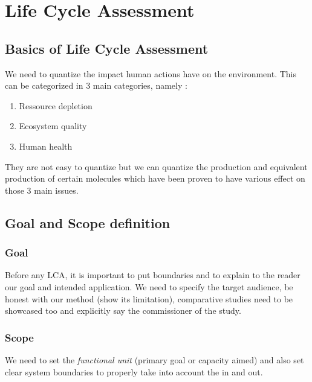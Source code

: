 \hypertarget{life-cycle-assessment}{%
\section{Life Cycle Assessment}\label{life-cycle-assessment}}

\hypertarget{basics-of-life-cycle-assessment}{%
\subsection{Basics of Life Cycle
Assessment}\label{basics-of-life-cycle-assessment}}

We need to quantize the impact human actions have on the environment.
This can be categorized in 3 main categories, namely :

\begin{enumerate}
\def\labelenumi{\arabic{enumi}.}
\tightlist
\item
  Ressource depletion
\item
  Ecosystem quality
\item
  Human health
\end{enumerate}

They are not easy to quantize but we can quantize the production and
equivalent production of certain molecules which have been proven to
have various effect on those 3 main issues.

\hypertarget{goal-and-scope-definition}{%
\subsection{Goal and Scope definition}\label{goal-and-scope-definition}}

\hypertarget{goal}{%
\subsubsection{Goal}\label{goal}}

Before any LCA, it is important to put boundaries and to explain to the
reader our goal and intended application. We need to specify the target
audience, be honest with our method (show its limitation), comparative
studies need to be showcased too and explicitly say the commissioner of
the study.

\hypertarget{scope}{%
\subsubsection{Scope}\label{scope}}

We need to set the \emph{functional unit} (primary goal or capacity
aimed) and also set clear system boundaries to properly take into
account the in and out.

